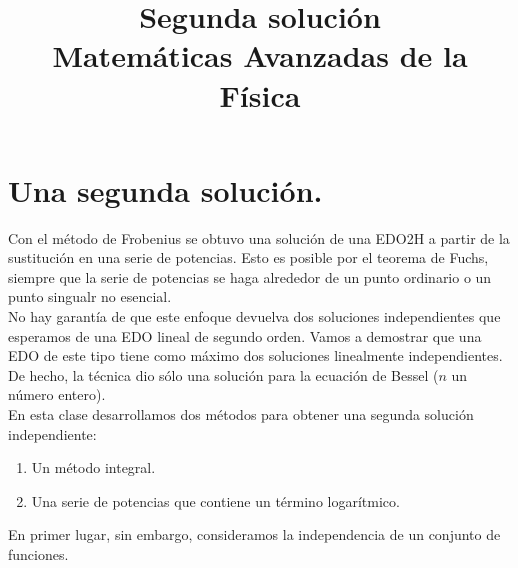 
\title{Segunda solución \\ \large {Matemáticas Avanzadas de la Física}}
\date{}

\renewcommand\labelenumii{\theenumi.{\arabic{enumii}}}
\maketitle
\fontsize{14}{14}\selectfont
\section{Una segunda solución.}
Con el método de Frobenius se obtuvo una solución de una EDO2H a partir de la sustitución en una serie de potencias. Esto es posible por el teorema de Fuchs, siempre que la serie de potencias se haga alrededor de un punto ordinario o un punto singualr no esencial.
\\
No hay garantía de que este enfoque devuelva dos soluciones independientes que esperamos de una EDO lineal de segundo orden. Vamos a demostrar que una EDO de este tipo tiene como máximo dos soluciones linealmente independientes. De hecho, la técnica dio sólo una solución para la ecuación de Bessel ($n$ un número entero).
\\
En esta clase desarrollamos dos métodos para obtener una segunda solución independiente: \begin{enumerate}
\item Un método integral.
\item Una serie de potencias que contiene un término logarítmico.
\end{enumerate}
En primer lugar, sin embargo, consideramos la independencia de un conjunto de funciones.
